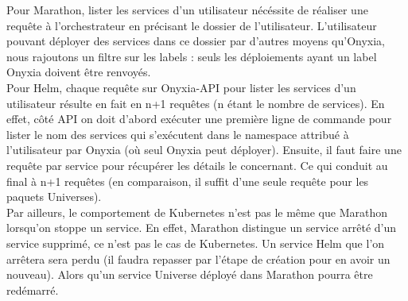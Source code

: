 \documentclass[11pt,fleqn]{book} %
\begin{document}
Pour Marathon, lister les services d'un utilisateur nécéssite de réaliser une requête à l'orchestrateur en précisant le dossier de l'utilisateur. L'utilisateur pouvant déployer des services dans ce dossier par d'autres moyens qu'Onyxia, nous rajoutons un filtre sur les labels : seuls les déploiements ayant un label Onyxia doivent être renvoyés.\\

Pour Helm, chaque requête sur Onyxia-API pour lister les services d'un utilisateur résulte en fait en n+1 requêtes (n étant le nombre de services). En effet, côté API on doit d'abord exécuter une première ligne de commande pour lister le nom des services qui s'exécutent dans le namespace attribué à l'utilisateur par Onyxia (où seul Onyxia peut déployer). Ensuite, il faut faire une requête par service pour récupérer les détails le concernant. Ce qui conduit au final à n+1 requêtes (en comparaison, il suffit d'une seule requête pour les paquets Universes). \\

Par ailleurs, le comportement de Kubernetes n'est pas le même que Marathon lorsqu'on stoppe un service. En effet, Marathon distingue un service arrêté d'un service supprimé, ce n'est pas le cas de Kubernetes. Un service Helm que l'on arrêtera sera perdu (il faudra repasser par l'étape de création pour en avoir un nouveau). Alors qu'un service Universe déployé dans Marathon pourra être redémarré.
\end{document}
